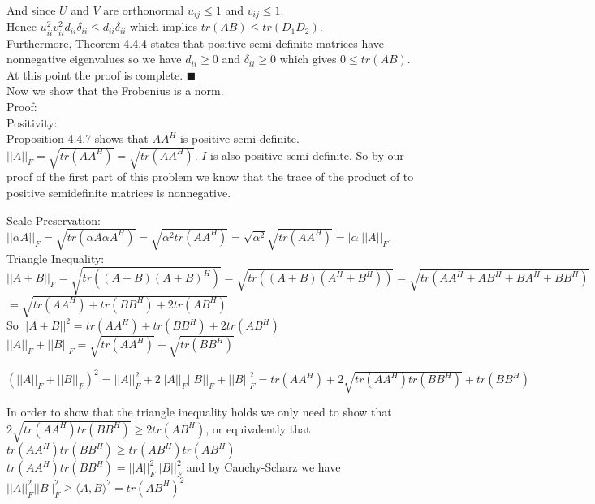 \documentclass[letterpaper,12pt]{article}
\theoremstyle{definition}
\begin{document}
 And since $U$ and $V$ are orthonormal $u_{ij}\leq 1$ and $v_{ij}\leq 1$.\\
 Hence $u_{ii}^2v_{ii}^2d_{ii}\delta_{ii}\leq d_{ii}\delta_{ii}$ which implies $tr(AB) \leq tr(D_1D_2)$.\\
Furthermore, Theorem 4.4.4 states that positive semi-definite matrices have nonnegative eigenvalues so we have $d_{ii}\geq 0$ and $\delta_{ii}\geq 0$ which gives $0\leq tr(AB)$. At this point the proof is complete. 
\hfill $\blacksquare$\\
Now we show that the Frobenius is a norm.\\
Proof:\\
Positivity:\\
Proposition 4.4.7 shows that $AA^H$ is positive semi-definite. $||A||_F = \sqrt{tr(AA^H)} = \sqrt{tr(AA^H)}$. $I$ is also positive semi-definite. So by our proof of the first part of this problem we know that the trace of the product of to positive semidefinite matrices is nonnegative. 

Scale Preservation:\\$||\alpha A||_F =\sqrt{tr(\alpha A \alpha A^H)} = \sqrt{  \alpha^2tr(AA^H)} = \sqrt{\alpha^2}\sqrt{tr(AA^H)} = |\alpha|||A||_F$.\\  

Triangle Inequality:\\
$||A+B||_F = \sqrt{ tr( (A+B)(A+B)^H    )     } = \sqrt{ tr( (A+B)(A^H+B^H)    )     } = \sqrt{ tr( AA^H + AB^H +BA^H+BB^H    )     }$\\
$=\sqrt{tr(AA^H) + tr(BB^H) + 2tr(AB^H)       }$\\

So $||A+B||^2 = tr(AA^H) + tr(BB^H) + 2tr(AB^H)$\\

$||A||_F + ||B||_F = \sqrt{tr(AA^H)} + \sqrt{tr(BB^H)}$

$(||A||_F + ||B||_F)^2 = ||A||_F^2 +2||A||_F||B||_F + ||B||_F^2 = tr(AA^H)+ 2\sqrt{tr(AA^H)tr(BB^H)} + tr(BB^H)$ 

In order to show that the triangle inequality holds we only need to show that $2\sqrt{tr(AA^H)tr(BB^H)} \geq 2tr(AB^H) $, or equivalently that $tr(AA^H)tr(BB^H) \geq tr(AB^H)tr(AB^H)$ \\

$tr(AA^H)tr(BB^H) = ||A||_F^2||B||_F^2$ and by Cauchy-Scharz we have\\
$ ||A||_F^2||B||_F^2 \geq \langle A,B\rangle^2 =tr(AB^H)^2$\\
\end{document}
